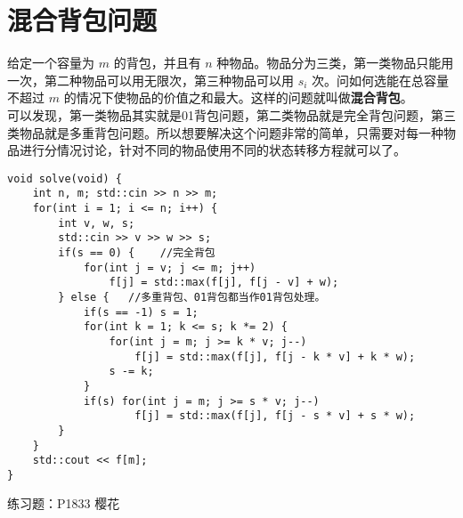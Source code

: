 \documentclass{beamer}
\newcommand{\fdf}[1]{\alert{\textbf{#1}}}
\begin{document}
\section{混合背包问题}
\begin{frame}
给定一个容量为 $m$ 的背包，并且有 $n$ 种物品。物品分为三类，第一类物品只能用一次，第二种物品可以用无限次，第三种物品可以用 $s_i$ 次。问如何选能在总容量不超过 $m$ 的情况下使物品的价值之和最大。这样的问题就叫做\fdf{混合背包}。\\ 
可以发现，第一类物品其实就是01背包问题，第二类物品就是完全背包问题，第三类物品就是多重背包问题。所以想要解决这个问题非常的简单，只需要对每一种物品进行分情况讨论，针对不同的物品使用不同的状态转移方程就可以了。\\
\end{frame}
\begin{frame}[fragile]
\begin{onlyenv}
\begin{verbatim}
void solve(void) {
    int n, m; std::cin >> n >> m;
    for(int i = 1; i <= n; i++) {
        int v, w, s;
        std::cin >> v >> w >> s;
        if(s == 0) {    //完全背包
            for(int j = v; j <= m; j++)
                f[j] = std::max(f[j], f[j - v] + w);
        } else {   //多重背包、01背包都当作01背包处理。
            if(s == -1) s = 1;
            for(int k = 1; k <= s; k *= 2) {
                for(int j = m; j >= k * v; j--) 
                    f[j] = std::max(f[j], f[j - k * v] + k * w);
                s -= k;
            }
            if(s) for(int j = m; j >= s * v; j--)
                    f[j] = std::max(f[j], f[j - s * v] + s * w);
        }
    }
    std::cout << f[m];
}
\end{verbatim}
\end{onlyenv}
练习题：P1833 樱花
\end{frame}
\end{document}
